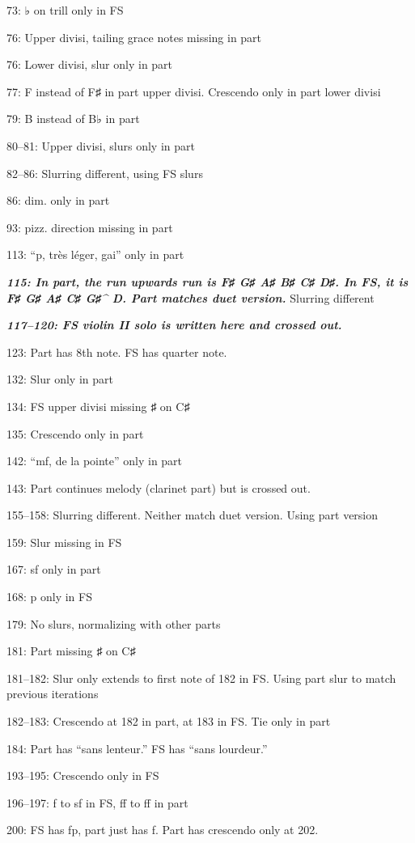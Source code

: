 \documentclass[twoside]{article}
\begin{document}
\begin{hangparas}{15pt}{1}
\begin{multicols}{2}
73: ♭ on trill only in FS

76: Upper divisi, tailing grace notes missing in part

76: Lower divisi, slur only in part

77: F instead of F♯ in part upper divisi. Crescendo only in part lower divisi

79: B instead of B♭ in part

80--81: Upper divisi, slurs only in part

82--86: Slurring different, using FS slurs

86: dim. only in part

93: pizz. direction missing in part

113: ``p, très léger, gai'' only in part

\textbf{\textit{115: In part, the run upwards run is F♯ G♯ A♯ B♯ C♯ D♯. In FS, it is F♯ G♯ A♯ C♯ G♯\^{} D. Part matches duet version.}} Slurring different

\textbf{\textit{117--120: FS violin II solo is written here and crossed out.}}

123: Part has 8th note. FS has quarter note.

132: Slur only in part

134: FS upper divisi missing ♯ on C♯

135: Crescendo only in part

142: ``mf, de la pointe'' only in part

143: Part continues melody (clarinet part) but is crossed out.

155--158: Slurring different. Neither match duet version. Using part version

159: Slur missing in FS

167: sf only in part

168: p only in FS

179: No slurs, normalizing with other parts

181: Part missing ♯ on C♯

181--182: Slur only extends to first note of 182 in FS. Using part slur to match previous iterations

182--183: Crescendo at 182 in part, at 183 in FS. Tie only in part

184: Part has ``sans lenteur.'' FS has ``sans lourdeur.''

193--195: Crescendo only in FS

196--197: f to sf in FS, ff to ff in part

200: FS has fp, part just has f. Part has crescendo only at 202.


\end{multicols}
\end{hangparas}
\end{document}
